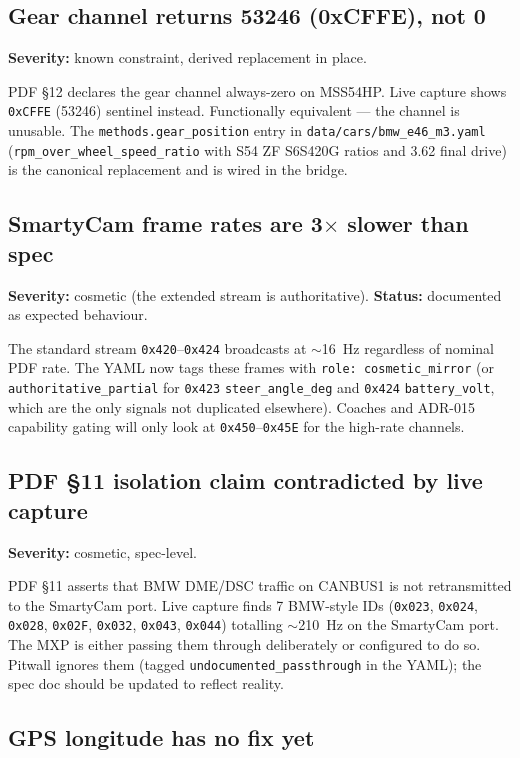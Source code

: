 \documentclass[11pt,a4paper]{article}
\newcommand{\hex}[1]{\texttt{0x#1}}
\begin{document}
\subsection{Gear channel returns 53246 (0xCFFE), not 0}

\textbf{Severity:} known constraint, derived replacement in place.

PDF \S 12 declares the gear channel always-zero on MSS54HP. Live
capture shows \hex{CFFE} (53246) sentinel instead. Functionally
equivalent --- the channel is unusable. The
\texttt{methods.gear\_position} entry in
\texttt{data/cars/bmw\_e46\_m3.yaml} (\texttt{rpm\_over\_wheel\_speed\_ratio}
with S54 ZF S6S420G ratios and 3.62 final drive) is the canonical
replacement and is wired in the bridge.

\subsection{SmartyCam frame rates are 3$\times$ slower than spec}

\textbf{Severity:} cosmetic (the extended stream is authoritative).
\textbf{Status:} documented as expected behaviour.

The standard stream \hex{420}--\hex{424} broadcasts at $\sim$\SI{16}{Hz}
regardless of nominal PDF rate. The YAML now tags these frames with
\texttt{role: cosmetic\_mirror} (or \texttt{authoritative\_partial}
for \hex{423} \texttt{steer\_angle\_deg} and \hex{424}
\texttt{battery\_volt}, which are the only signals not duplicated
elsewhere). Coaches and ADR-015 capability gating will only look at
\hex{450}--\hex{45E} for the high-rate channels.

\subsection{PDF \S 11 isolation claim contradicted by live capture}

\textbf{Severity:} cosmetic, spec-level.

PDF \S 11 asserts that BMW DME/DSC traffic on CANBUS1 is not
retransmitted to the SmartyCam port. Live capture finds 7 BMW-style
IDs (\hex{023}, \hex{024}, \hex{028}, \hex{02F}, \hex{032},
\hex{043}, \hex{044}) totalling $\sim$\SI{210}{Hz} on the SmartyCam
port. The MXP is either passing them through deliberately or
configured to do so. Pitwall ignores them (tagged
\texttt{undocumented\_passthrough} in the YAML); the spec doc should
be updated to reflect reality.

\subsection{GPS longitude has no fix yet}
\end{document}
